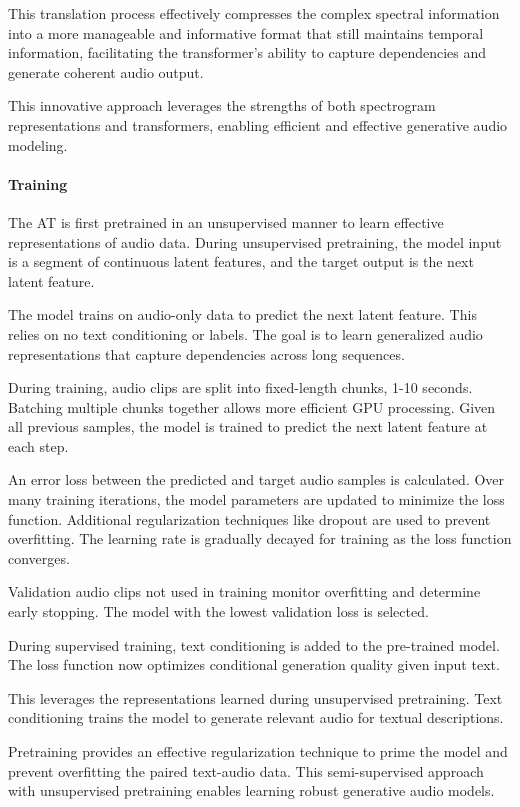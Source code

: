 This translation process effectively compresses the complex spectral information into a more manageable and informative format that still maintains temporal information, facilitating the transformer's ability to capture dependencies and generate coherent audio output.

This innovative approach leverages the strengths of both spectrogram representations and transformers, enabling efficient and effective generative audio modeling.

\paragraph{Training}

The \ac{AT} is first pretrained in an unsupervised manner to learn effective representations of audio data. During unsupervised pretraining, the model input is a segment of continuous latent features, and the target output is the next latent feature.

The model trains on audio-only data to predict the next latent feature. This relies on no text conditioning or labels. The goal is to learn generalized audio representations that capture dependencies across long sequences.

During training, audio clips are split into fixed-length chunks, 1-10 seconds. Batching multiple chunks together allows more efficient \ac{GPU} processing. Given all previous samples, the model is trained to predict the next latent feature at each step.

An error loss between the predicted and target audio samples is calculated. Over many training iterations, the model parameters are updated to minimize the loss function. Additional regularization techniques like dropout are used to prevent overfitting. The learning rate is gradually decayed for training as the loss function converges.

Validation audio clips not used in training monitor overfitting and determine early stopping. The model with the lowest validation loss is selected.

During supervised training, text conditioning is added to the pre-trained model. The loss function now optimizes conditional generation quality given input text.

This leverages the representations learned during unsupervised pretraining. Text conditioning trains the model to generate relevant audio for textual descriptions.

Pretraining provides an effective regularization technique to prime the model and prevent overfitting the paired text-audio data. This semi-supervised approach with unsupervised pretraining enables learning robust generative audio models.

